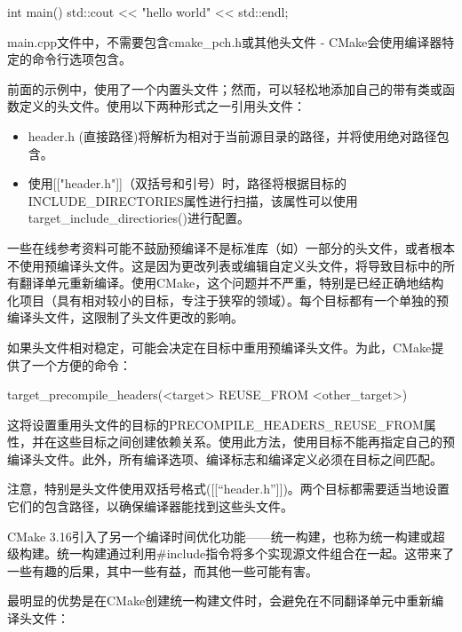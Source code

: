
\begin{cmake}
int main() {
    std::cout << "hello world" << std::endl;
}
\end{cmake}

main.cpp文件中，不需要包含cmake\_pch.h或其他头文件 - CMake会使用编译器特定的命令行选项包含。

前面的示例中，使用了一个内置头文件；然而，可以轻松地添加自己的带有类或函数定义的头文件。使用以下两种形式之一引用头文件：

\begin{itemize}
\item
header.h (直接路径)将解析为相对于当前源目录的路径，并将使用绝对路径包含。

\item
使用[["header.h"]]（双括号和引号）时，路径将根据目标的INCLUDE\_DIRECTORIES属性进行扫描，该属性可以使用target\_include\_directiories()进行配置。
\end{itemize}

一些在线参考资料可能不鼓励预编译不是标准库（如）一部分的头文件，或者根本不使用预编译头文件。这是因为更改列表或编辑自定义头文件，将导致目标中的所有翻译单元重新编译。使用CMake，这个问题并不严重，特别是已经正确地结构化项目（具有相对较小的目标，专注于狭窄的领域）。每个目标都有一个单独的预编译头文件，这限制了头文件更改的影响。

如果头文件相对稳定，可能会决定在目标中重用预编译头文件。为此，CMake提供了一个方便的命令：

\begin{shell}
target_precompile_headers(<target> REUSE_FROM <other_target>)
\end{shell}

这将设置重用头文件的目标的PRECOMPILE\_HEADERS\_REUSE\_FROM属性，并在这些目标之间创建依赖关系。使用此方法，使用目标不能再指定自己的预编译头文件。此外，所有编译选项、编译标志和编译定义必须在目标之间匹配。

注意，特别是头文件使用双括号格式([[“header.h”]])。两个目标都需要适当地设置它们的包含路径，以确保编译器能找到这些头文件。


CMake 3.16引入了另一个编译时间优化功能——统一构建，也称为统一构建或超级构建。统一构建通过利用\#include指令将多个实现源文件组合在一起。这带来了一些有趣的后果，其中一些有益，而其他一些可能有害。

最明显的优势是在CMake创建统一构建文件时，会避免在不同翻译单元中重新编译头文件：

